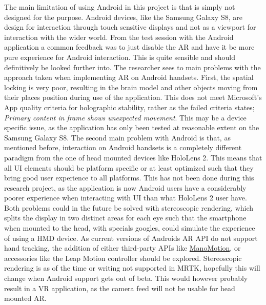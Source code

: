 The main limitation of using Android in this project is that is simply not designed for the purpose. Android devices, like the Samsung Galaxy S8, are design for interaction through touch sensitive displays and not as a viewport for interaction with the wider world. From the test session with the Android application a common feedback was to just disable the AR and have it be more pure experience for Android interaction. This is quite sensible and should definitively be looked further into. The researcher sees to main problems with the approach taken when implementing AR on Android handsets. First, the spatial locking is very poor, resulting in the brain model and other objects moving from their places position during use of the application. This does not meet Microsoft's App quality criteria for holographic stability, rather as the failed criteria states; \textit{Primary content in frame shows unexpected movement}. This may be a device specific issue, as the application has only been tested at reasonable extent on the Samsung Galaxy S8.
The second main problem with Android is that, as mentioned before, interaction on Android handsets is a completely different paradigm from the one of head mounted devices like  HoloLens 2. This means that all UI elements should be platform specific or at least optimized such that they bring good user experience to all platforms. This has not been done during this research project, as the application is now Android users have a considerably poorer experience when interacting with UI than what HoloLens 2 user have. 
Both problems could in the future be solved with stereoscopic rendering, which splits the display in two distinct areas for each eye such that the smartphone when mounted to the head, with specials googles, could simulate the experience of using a HMD device. As current versions of Androids AR API do not support hand tracking, the addition of either third-party APIs like \href{https://www.manomotion.com}{ManoMotion}, or accessories like the Leap Motion controller should be explored. Stereoscopic rendering is as of the time or writing not supported in MRTK, hopefully this will change when Android support gets out of beta. This would however probably result in a VR application, as the camera feed will not be usable for head mounted AR.


